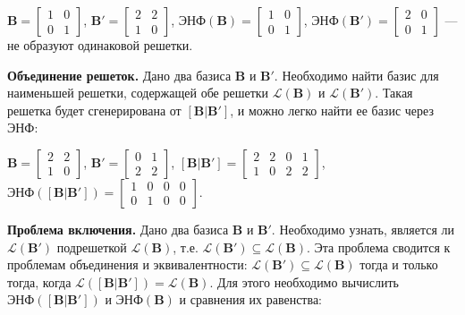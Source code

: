 $ \mathbf{B} = \left[\begin{array}{cccc}
1 & 0 \\
0 & 1
\end{array}\right] $, 
$ \mathbf{B}' = \left[\begin{array}{cccc}
2 & 2 \\
1 & 0
\end{array}\right] $, 
$ \text{ЭНФ}(\mathbf{B}) = \left[\begin{array}{cccc}
1 & 0 \\
0 & 1
\end{array}\right] $,
$ \text{ЭНФ}(\mathbf{B}') = \left[\begin{array}{cccc}
2 & 0 \\
0 & 1
\end{array}\right] $ --- не образуют одинаковой решетки.

\textbf{Объединение решеток.} Дано два базиса $ \mathbf{B} $ и $ \mathbf{B}' $. Необходимо найти базис для наименьшей решетки, содержащей обе решетки $ \mathcal{L}(\mathbf{B}) $ и $ \mathcal{L}(\mathbf{B}') $. Такая решетка будет сгенерирована от $ \left[\mathbf{B}|\mathbf{B}'\right] $, и можно легко найти ее базис через ЭНФ:

$ \mathbf{B} = \left[\begin{array}{cccc}
2 & 2 \\
1 & 0
\end{array}\right] $, 
$ \mathbf{B}' = \left[\begin{array}{cccc}
0 & 1 \\
2 & 2
\end{array}\right] $, 
$ \left[\mathbf{B} | \mathbf{B}'\right] = \left[\begin{array}{cccc}
2 & 2 & 0 & 1 \\
1 & 0 & 2 & 2
\end{array}\right] $, 
$ \text{ЭНФ}(\left[\mathbf{B} | \mathbf{B}' \right]) = \left[\begin{array}{cccc}
1 & 0 & 0 & 0 \\
0 & 1 & 0 & 0
\end{array}\right] $.

\textbf{Проблема включения.} Дано два базиса $ \mathbf{B} $ и $ \mathbf{B}' $. Необходимо узнать, является ли $ \mathcal{L}(\mathbf{B}') $ подрешеткой $ \mathcal{L}(\mathbf{B}) $, т.е. $ \mathcal{L}(\mathbf{B}') \subseteq \mathcal{L}(\mathbf{B}) $. Эта проблема сводится к проблемам объединения и эквивалентности: $ \mathcal{L}(\mathbf{B}') \subseteq \mathcal{L}(\mathbf{B}) $ тогда и только тогда, когда $ \mathcal{L}(\left[\mathbf{B}|\mathbf{B}'\right]) = \mathcal{L}(\mathbf{B}) $. Для этого необходимо вычислить $ \text{ЭНФ}(\left[\mathbf{B} | \mathbf{B}' \right]) $ и $ \text{ЭНФ}(\mathbf{B}) $ и сравнения их равенства:

